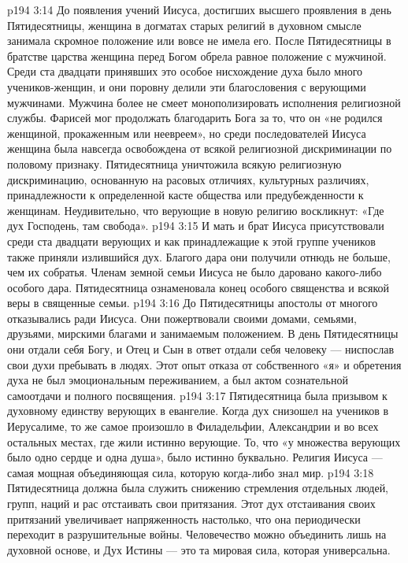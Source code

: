 \vs p194 3:14 \pc До появления учений Иисуса, достигших высшего проявления в день Пятидесятницы, женщина в догматах старых религий в духовном смысле занимала скромное положение или вовсе не имела его. После Пятидесятницы в братстве царства женщина перед Богом обрела равное положение с мужчиной. Среди ста двадцати принявших это особое нисхождение духа было много учеников\hyp{}женщин, и они поровну делили эти благословения с верующими мужчинами. Мужчина более не смеет монополизировать исполнения религиозной службы. Фарисей мог продолжать благодарить Бога за то, что он «не родился женщиной, прокаженным или неевреем», но среди последователей Иисуса женщина была навсегда освобождена от всякой религиозной дискриминации по половому признаку. Пятидесятница уничтожила всякую религиозную дискриминацию, основанную на расовых отличиях, культурных различиях, принадлежности к определенной касте общества или предубежденности к женщинам. Неудивительно, что верующие в новую религию воскликнут: «Где дух Господень, там свобода».
\vs p194 3:15 \pc И мать и брат Иисуса присутствовали среди ста двадцати верующих и как принадлежащие к этой группе учеников также приняли излившийся дух. Благого дара они получили отнюдь не больше, чем их собратья. Членам земной семьи Иисуса не было даровано какого\hyp{}либо особого дара. Пятидесятница ознаменовала конец особого священства и всякой веры в священные семьи.
\vs p194 3:16 \pc До Пятидесятницы апостолы от многого отказывались ради Иисуса. Они пожертвовали своими домами, семьями, друзьями, мирскими благами и занимаемым положением. В день Пятидесятницы они отдали себя Богу, и Отец и Сын в ответ отдали себя человеку --- ниспослав свои духи пребывать в людях. Этот опыт отказа от собственного «я» и обретения духа не был эмоциональным переживанием, а был актом сознательной самоотдачи и полного посвящения.
\vs p194 3:17 Пятидесятница была призывом к духовному единству верующих в евангелие. Когда дух снизошел на учеников в Иерусалиме, то же самое произошло в Филадельфии, Александрии и во всех остальных местах, где жили истинно верующие. То, что «у множества верующих было одно сердце и одна душа», было истинно буквально. Религия Иисуса --- самая мощная объединяющая сила, которую когда\hyp{}либо знал мир.
\vs p194 3:18 \pc Пятидесятница должна была служить снижению стремления отдельных людей, групп, наций и рас отстаивать свои притязания. Этот дух отстаивания своих притязаний увеличивает напряженность настолько, что она периодически переходит в разрушительные войны. Человечество можно объединить лишь на духовной основе, и Дух Истины --- это та мировая сила, которая универсальна.
